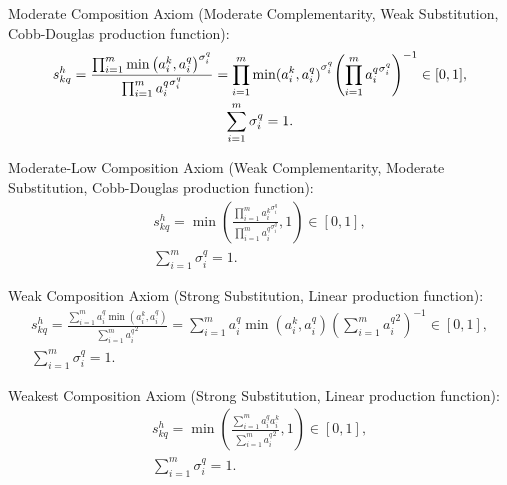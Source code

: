 \documentclass{elsarticle} %
\begin{document}
Moderate Composition Axiom (Moderate Complementarity, Weak Substitution, Cobb-Douglas production function):
\begin{gather*}
    s_{kq}^{h} = 
    \frac{
        \prod_{i=1}^{m}{
            {\min\left(
                {a_{i}^{k}},
                {a_{i}^{q}}
            \right)} ^ {
            \sigma_{i}^{q}
        }
    }
    }{
        \prod_{i=1}^{m}{
        {a_{i}^{q}} ^ {
            \sigma_{i}^{q}
        }
    }
    }
    =
    \prod_{i=1}^{m}{
            {\min(
                {a_{i}^{k}},
                {a_{i}^{q}}
            )} ^ {
            \sigma_{i}^{q}
        }
    }{\left(
        \prod_{i=1}^{m}{
        {a_{i}^{q}} ^ {
            \sigma_{i}^{q}
        }
    }\right)} ^ {-1}
    \in [0,1]
    ,\\
    \sum_{i=1}^{m}{
        \sigma_{i}^{q}
    } = 1
    .
\end{gather*}

Moderate-Low Composition Axiom (Weak Complementarity, Moderate Substitution, Cobb-Douglas production function):
\begin{gather*}
    s_{kq}^{h} = 
    \min\left(
        \frac{
        \prod_{i=1}^{m}{
        {a_{i}^{k}} ^ {
            \sigma_{i}^{q}
        }
    }
    }{
        \prod_{i=1}^{m}{
        {a_{i}^{q}} ^ {
            \sigma_{i}^{q}
        }
    }
    }
    , 1
    \right)
    \in [0,1]
    ,\\
    \sum_{i=1}^{m}{
        \sigma_{i}^{q}
    } = 1
    .
\end{gather*}

Weak Composition Axiom (Strong Substitution, Linear production function):
\begin{gather*}
    s_{kq}^{h} = 
        \frac{
        \sum_{i=1}^{m}{
            a_{i}^{q}
            \min(
                {a_{i}^{k}},           
                {a_{i}^{q}}
            )
    }
    }{
        \sum_{i=1}^{m}{
        {a_{i}^{q}} ^ 2
    }
    } = 
    {\sum_{i=1}^{m}{
            a_{i}^{q}
            \min(
                {a_{i}^{k}},           
                {a_{i}^{q}}
            )
    }}{\left(
        \sum_{i=1}^{m}{
        {a_{i}^{q}} ^ 2
        }
    \right)
    } ^ {-1}
    \in [0,1]
    ,\\
    \sum_{i=1}^{m}{
        \sigma_{i}^{q}
    } = 1
    .
\end{gather*}

Weakest Composition Axiom (Strong Substitution, Linear production function):
\begin{gather*}
    s_{kq}^{h} = 
    \min\left(
        \frac{
        \sum_{i=1}^{m}{
        {a_{i}^{q}}
        {a_{i}^{k}}
    }
    }{
        \sum_{i=1}^{m}{
        {a_{i}^{q}} ^ 2
    }
    }
    , 1
    \right)
    \in [0,1]
    ,\\
    \sum_{i=1}^{m}{
        \sigma_{i}^{q}
    } = 1
    .
\end{gather*}
\end{document}
